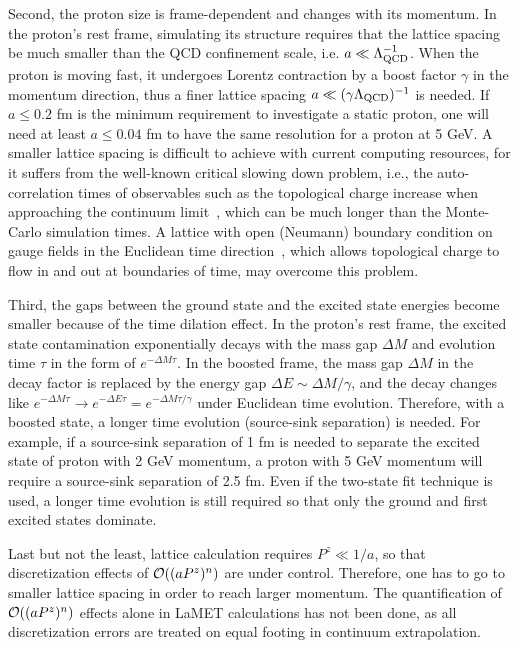 Second, the proton size is frame-dependent and changes with its momentum.
%
In the proton's rest frame, simulating its structure requires that the lattice spacing be much smaller than the QCD confinement scale, i.e. $a\ll\Lambda_{\rm QCD}^{-1}$.
%
When the proton is moving fast, it undergoes Lorentz contraction by a boost factor $\gamma$ in the momentum direction, thus a finer lattice spacing $a\ll(\gamma \Lambda_{\rm QCD})^{-1}$ is needed.
%
If $a\leq 0.2$ fm is the minimum requirement to investigate a static proton, one will need at least $a\leq 0.04$ fm to have the same resolution for a proton at 5 GeV.
%
A smaller lattice spacing is difficult to achieve with current computing resources,
for it suffers from the well-known critical slowing down problem, i.e., the auto-correlation times of observables such as the topological charge increase when approaching the continuum limit~\cite{Schaefer:2010hu}, which can be much longer than the Monte-Carlo simulation times.
%
A lattice with open (Neumann) boundary condition on gauge fields in the Euclidean time direction~\cite{Luscher:2011kk}, which allows topological charge to flow in and out at boundaries of time, may overcome this problem.


Third, the gaps between the ground state and the excited state energies become smaller because of the time dilation effect.
%
In the proton's rest frame, the excited state contamination exponentially decays with the mass gap $\Delta M$ and evolution time $\tau$ in the form of $e^{-\Delta M \tau}$.
%
In the boosted frame, the mass gap $\Delta M$ in the decay factor is replaced by the energy gap $\Delta E \sim \Delta M/\gamma$, and the decay changes like $e^{-\Delta M \tau} \to e^{-\Delta E \tau}=e^{-\Delta M \tau / \gamma}$ under Euclidean time evolution.
%
Therefore, with a boosted state, a longer time evolution (source-sink separation) is needed.
%
For example, if a source-sink separation of 1 fm is needed to separate the excited state of proton with 2 GeV momentum, a proton with 5 GeV momentum will require a source-sink separation of 2.5 fm.
%
Even if the two-state fit technique is used, a longer time evolution is still required so that only the ground and first excited states dominate.

Last but not the least, lattice calculation requires $P^z\ll 1/a$, so that discretization effects of ${\cal O}((aP^z)^n)$ are under control. Therefore, one has to go to smaller lattice spacing in order to reach larger momentum. The quantification of ${\cal O}((aP^z)^n)$ effects alone in LaMET calculations has not been done, as all discretization errors are treated on equal footing in continuum extrapolation.

